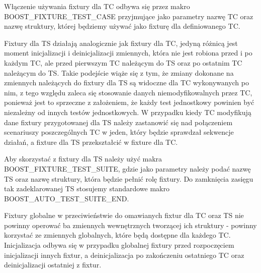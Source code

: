 \documentclass[12pt,a4paper,notitlepage]{report}
\begin{document}
Włączenie używania fixtury dla TC odbywa się przez makro BOOST{\_}FIXTURE{\_}TEST{\_}CASE przyjmujące jako parametry nazwę TC oraz nazwę struktury, której będziemy używać jako fixturę dla definiowanego TC.

			

Fixtury dla TS działają analogicznie jak fixtury dla TC, jedyną różnicą jest moment inicjalizacji i deinicjalizacji zmiennych, która nie jest robiona przed i po każdym TC, ale przed pierwszym TC należącym do TS oraz po ostatnim TC należącym do TS.
Takie podejście wiąże się z tym, że zmiany dokonane na zmiennych należących do fixtury dla TS są widoczne dla TC wykonywanych po nim, z tego względu zaleca się stosowanie danych niemodyfikowalnych przez TC, ponieważ jest to sprzeczne z założeniem, że każdy test jednostkowy powinien być niezależny od innych testów jednostkowych.
W przypadku kiedy TC modyfikują dane fixtury przygotowanej dla TS należy zastanowić się nad połączeniem scenariuszy poszczególnych TC w jeden, który będzie sprawdzał sekwencje działań, a fixture dla TS przekształcić w fixture dla TC.

Aby skorzystać z fixtury dla TS należy użyć makra BOOST{\_}FIXTURE{\_}TEST{\_}SUITE, gdzie jako parametry należy podać nazwę TS oraz nazwę struktury, która będzie pełnić rolę fixtury. Do zamknięcia zasięgu tak zadeklarowanej TS stosujemy standardowe makro BOOST{\_}AUTO{\_}TEST{\_}SUITE{\_}END.

			

Fixtury globalne w przeciwieństwie do omawianych fixtur dla TC oraz TS nie powinny operować ba zmiennych wewnętrznych tworzącej ich struktury - powinny korzystać ze zmiennych globalnych, które będą dostępne dla każdego TC.
Inicjalizacja odbywa się w przypadku globalnej fixtury przed rozpoczęciem inicjalizacji innych fixtur, a deinicjalizacja po zakończeniu ostatniego TC oraz deinicjalizacji ostatniej z fixtur.
\end{document}
